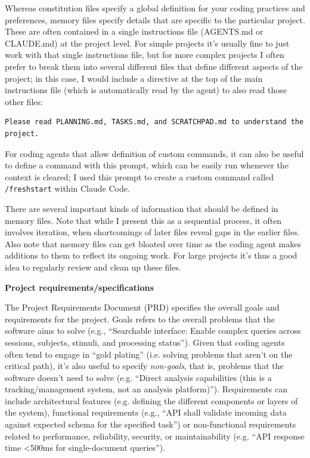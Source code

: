 Whereas constitution files specify a global definition for your coding practices and preferences, memory files specify details that are specific to the particular project.  These are often contained in a single instructions file (AGENTS.md or CLAUDE.md) at the project level.  For simple projects it's usually fine to just work with that single instructions file, but for more complex projects I often prefer to break them into several different files that define different aspects of the project; in this case, I would include a directive at the top of the main instructions file (which is automatically read by the agent) to also read those other files:

\begin{lstlisting}
Please read PLANNING.md, TASKS.md, and SCRATCHPAD.md to understand the project.
\end{lstlisting}

For coding agents that allow definition of custom commands, it can also be useful to define a command with this prompt, which can be easily run whenever the context is cleared; I used this prompt to create a custom command called \texttt{/freshstart} within Claude Code.

There are several important kinds of information that should be defined in memory files. Note that while I present this as a sequential process, it often involves iteration, when shortcomings of later files reveal gaps in the earlier files.
Also note that memory files can get bloated over time as the coding agent makes additions to them to reflect its ongoing work.  For large projects it's thus a good idea to regularly review and clean up these files.

\textbf{Project requirements/specifications}

The Project Requirements Document (PRD) specifies the overall goals and requirements for the project. Goals refers to the overall problems that the software aims to solve (e.g., ``Searchable interface: Enable complex queries across sessions, subjects, stimuli, and processing status'').  Given that coding agents often tend to engage in ``gold plating'' (i.e. solving problems that aren't on the critical path), it's also useful to specify \textit{non-goals}, that is, problems that the software doesn't need to solve (e.g. ``Direct analysis capabilities (this is a tracking/management system, not an analysis platform)''). Requirements can include architectural features (e.g. defining the different components or layers of the system), functional requirements (e.g., ``API shall validate incoming data against expected schema for the specified task'') or non-functional requirements related to performance, reliability, security, or maintainability (e.g. ``API response time \textless  500ms for single-document queries'').

